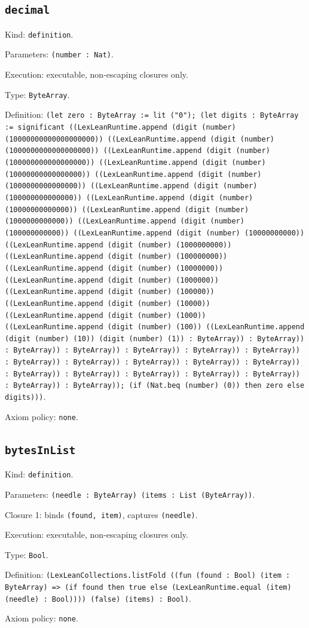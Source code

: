 \documentclass[11pt]{article}
\begin{document}
\subsection*{\texttt{decimal}}
\noindent Kind: \texttt{definition}.\par
\noindent Parameters: \texttt{(number : Nat)}.\par
\noindent Execution: executable, non-escaping closures only.\par
\noindent Type: \texttt{ByteArray}.\par
\noindent Definition: \texttt{(let zero : ByteArray := lit ("0"); (let digits : ByteArray := significant ((LexLeanRuntime.append (digit (number) (10000000000000000000)) ((LexLeanRuntime.append (digit (number) (1000000000000000000)) ((LexLeanRuntime.append (digit (number) (100000000000000000)) ((LexLeanRuntime.append (digit (number) (10000000000000000)) ((LexLeanRuntime.append (digit (number) (1000000000000000)) ((LexLeanRuntime.append (digit (number) (100000000000000)) ((LexLeanRuntime.append (digit (number) (10000000000000)) ((LexLeanRuntime.append (digit (number) (1000000000000)) ((LexLeanRuntime.append (digit (number) (100000000000)) ((LexLeanRuntime.append (digit (number) (10000000000)) ((LexLeanRuntime.append (digit (number) (1000000000)) ((LexLeanRuntime.append (digit (number) (100000000)) ((LexLeanRuntime.append (digit (number) (10000000)) ((LexLeanRuntime.append (digit (number) (1000000)) ((LexLeanRuntime.append (digit (number) (100000)) ((LexLeanRuntime.append (digit (number) (10000)) ((LexLeanRuntime.append (digit (number) (1000)) ((LexLeanRuntime.append (digit (number) (100)) ((LexLeanRuntime.append (digit (number) (10)) (digit (number) (1)) : ByteArray)) : ByteArray)) : ByteArray)) : ByteArray)) : ByteArray)) : ByteArray)) : ByteArray)) : ByteArray)) : ByteArray)) : ByteArray)) : ByteArray)) : ByteArray)) : ByteArray)) : ByteArray)) : ByteArray)) : ByteArray)) : ByteArray)) : ByteArray)) : ByteArray)); (if (Nat.beq (number) (0)) then zero else digits)))}.\par
\noindent Axiom policy: \texttt{none}.\par
\subsection*{\texttt{bytesInList}}
\noindent Kind: \texttt{definition}.\par
\noindent Parameters: \texttt{(needle : ByteArray) (items : List (ByteArray))}.\par
\noindent Closure 1: binds \texttt{(found, item)}, captures \texttt{(needle)}.\par
\noindent Execution: executable, non-escaping closures only.\par
\noindent Type: \texttt{Bool}.\par
\noindent Definition: \texttt{(LexLeanCollections.listFold ((fun (found : Bool) (item : ByteArray) => (if found then true else (LexLeanRuntime.equal (item) (needle) : Bool)))) (false) (items) : Bool)}.\par
\noindent Axiom policy: \texttt{none}.\par
\end{document}
